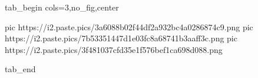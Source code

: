  
 
 
 
 

\ifcmt
  tab_begin cols=3,no_fig,center

     pic https://i2.paste.pics/3a6088b02f44df2a932bc4a0286874c9.png
		 pic https://i2.paste.pics/7b53351447d1e03fc8a68741b3aaff3c.png
		 pic https://i2.paste.pics/3f481037cfd35e1f576bef1ca698d088.png

  tab_end
\fi
